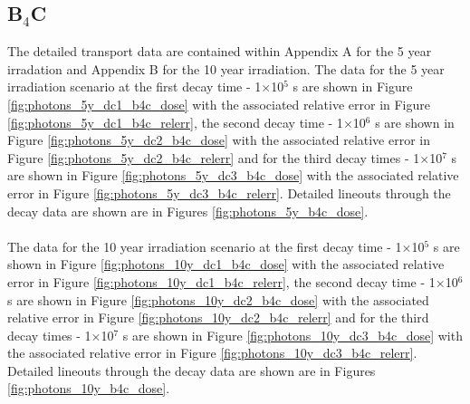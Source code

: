 \documentclass[12pt]{article}
\begin{document}
\subsection{B$_4$C}
The detailed transport data are contained within Appendix A for the 5 year irradation
and Appendix B for the 10 year irradiation. The data for the 5 year irradiation scenario
at the first decay time - 1$\times$10$^5$ s are shown in Figure \ref{fig:photons_5y_dc1_b4c_dose} with the
associated relative error in Figure \ref{fig:photons_5y_dc1_b4c_relerr}, the second
decay time - 1$\times$10$^6$ s are shown in Figure \ref{fig:photons_5y_dc2_b4c_dose} with the
associated relative error in Figure \ref{fig:photons_5y_dc2_b4c_relerr} and for the
third decay times - 1$\times$10$^7$ s are shown in Figure \ref{fig:photons_5y_dc3_b4c_dose} with the
associated relative error in Figure \ref{fig:photons_5y_dc3_b4c_relerr}. Detailed lineouts
through the decay data are shown are in Figures \ref{fig:photons_5y_b4c_dose}.
\\
\\
The data for the 10 year irradiation scenario
at the first decay time - 1$\times$10$^5$ s are shown in Figure \ref{fig:photons_10y_dc1_b4c_dose} with the
associated relative error in Figure \ref{fig:photons_10y_dc1_b4c_relerr}, the second
decay time - 1$\times$10$^6$ s are shown in Figure \ref{fig:photons_10y_dc2_b4c_dose} with the
associated relative error in Figure \ref{fig:photons_10y_dc2_b4c_relerr} and for the
third decay times - 1$\times$10$^7$ s are shown in Figure \ref{fig:photons_10y_dc3_b4c_dose} with the
associated relative error in Figure \ref{fig:photons_10y_dc3_b4c_relerr}. Detailed lineouts
through the decay data are shown are in Figures \ref{fig:photons_10y_b4c_dose}.
\newpage
\end{document}
